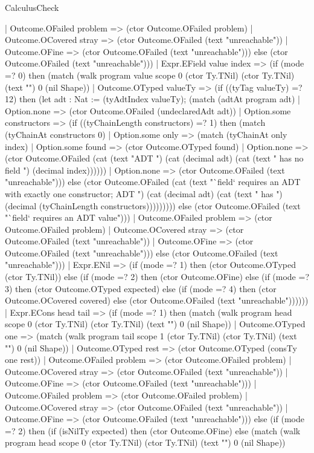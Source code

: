 \begin{lexlean}{CalculusCheck}
\begin{semanticmodule}
{      | Outcome.OFailed problem => (ctor Outcome.OFailed problem)
      | Outcome.OCovered stray => (ctor Outcome.OFailed (text "unreachable"))
      | Outcome.OFine => (ctor Outcome.OFailed (text "unreachable"))) else (ctor Outcome.OFailed (text "unreachable")))
    | Expr.EField value index => (if (mode =? 0) then (match (walk program value scope 0 (ctor Ty.TNil) (ctor Ty.TNil) (text "") 0 (nil Shape))
      | Outcome.OTyped valueTy => (if ((tyTag valueTy) =? 12) then (let adt : Nat := (tyAdtIndex valueTy); (match (adtAt program adt)
        | Option.none => (ctor Outcome.OFailed (undeclaredAdt adt))
        | Option.some constructors => (if ((tyChainLength constructors) =? 1) then (match (tyChainAt constructors 0)
          | Option.some only => (match (tyChainAt only index)
            | Option.some found => (ctor Outcome.OTyped found)
            | Option.none => (ctor Outcome.OFailed (cat (text "ADT ") (cat (decimal adt) (cat (text " has no field ") (decimal index))))))
          | Option.none => (ctor Outcome.OFailed (text "unreachable"))) else (ctor Outcome.OFailed (cat (text "`field` requires an ADT with exactly one constructor; ADT ") (cat (decimal adt) (cat (text " has ") (decimal (tyChainLength constructors))))))))) else (ctor Outcome.OFailed (text "`field` requires an ADT value")))
      | Outcome.OFailed problem => (ctor Outcome.OFailed problem)
      | Outcome.OCovered stray => (ctor Outcome.OFailed (text "unreachable"))
      | Outcome.OFine => (ctor Outcome.OFailed (text "unreachable"))) else (ctor Outcome.OFailed (text "unreachable")))
    | Expr.ENil => (if (mode =? 1) then (ctor Outcome.OTyped (ctor Ty.TNil)) else (if (mode =? 2) then (ctor Outcome.OFine) else (if (mode =? 3) then (ctor Outcome.OTyped expected) else (if (mode =? 4) then (ctor Outcome.OCovered covered) else (ctor Outcome.OFailed (text "unreachable"))))))
    | Expr.ECons head tail => (if (mode =? 1) then (match (walk program head scope 0 (ctor Ty.TNil) (ctor Ty.TNil) (text "") 0 (nil Shape))
      | Outcome.OTyped one => (match (walk program tail scope 1 (ctor Ty.TNil) (ctor Ty.TNil) (text "") 0 (nil Shape))
        | Outcome.OTyped rest => (ctor Outcome.OTyped (consTy one rest))
        | Outcome.OFailed problem => (ctor Outcome.OFailed problem)
        | Outcome.OCovered stray => (ctor Outcome.OFailed (text "unreachable"))
        | Outcome.OFine => (ctor Outcome.OFailed (text "unreachable")))
      | Outcome.OFailed problem => (ctor Outcome.OFailed problem)
      | Outcome.OCovered stray => (ctor Outcome.OFailed (text "unreachable"))
      | Outcome.OFine => (ctor Outcome.OFailed (text "unreachable"))) else (if (mode =? 2) then (if (isNilTy expected) then (ctor Outcome.OFine) else (match (walk program head scope 0 (ctor Ty.TNil) (ctor Ty.TNil) (text "") 0 (nil Shape))
}
\end{semanticmodule}
\end{lexlean}

